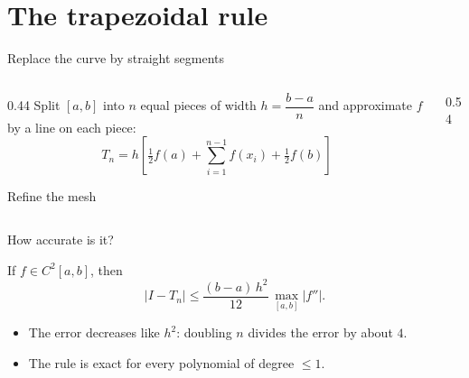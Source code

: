 \documentclass[aspectratio=169,11pt]{beamer}
\newcommand{\trapezoids}[1]{%
  \pgfmathtruncatemacro{\nm}{#1-1}%
  \foreach \i in {0,...,\nm}{%
    \pgfmathsetmacro{\xa}{\i/#1}\pgfmathsetmacro{\xb}{(\i+1)/#1}%
    \pgfmathsetmacro{\ya}{exp(-\xa*\xa)}\pgfmathsetmacro{\yb}{exp(-\xb*\xb)}%
    \addplot[draw=tealc!70!black,fill=tealc!22] coordinates {(\xa,0) (\xa,\ya) (\xb,\yb) (\xb,0)} \closedcycle;%
  }}
\begin{document}
\section{The trapezoidal rule}

\begin{frame}{Replace the curve by straight segments}
  \begin{columns}[T]
    \begin{column}{0.44\textwidth}
      Split $[a,b]$ into $n$ equal pieces of width $h=\dfrac{b-a}{n}$ and approximate $f$ by a line on each piece:
      \[
        T_n = h\left[\tfrac12 f(a) + \sum_{i=1}^{n-1} f(x_i) + \tfrac12 f(b)\right]
      \]
      \vspace{-0.3em}
      \begin{block}{Refine the mesh}
      \end{block}
    \end{column}
    \begin{column}{0.54\textwidth}
    \end{column}
  \end{columns}
\end{frame}

\begin{frame}{How accurate is it?}
  \begin{theorem}
    If $f\in C^{2}[a,b]$, then
    \[
      \lvert I-T_n\rvert \le \frac{(b-a)\,h^{2}}{12}\,\max_{[a,b]}\lvert f''\rvert .
    \]
  \end{theorem}
  \pause
  \begin{itemize}
    \setlength\itemsep{0.6em}
    \item The error decreases like $h^{2}$: \alert{doubling $n$ divides the error by about $4$}.
    \item The rule is exact for every polynomial of degree $\le 1$.
  \end{itemize}
\end{frame}
\end{document}
